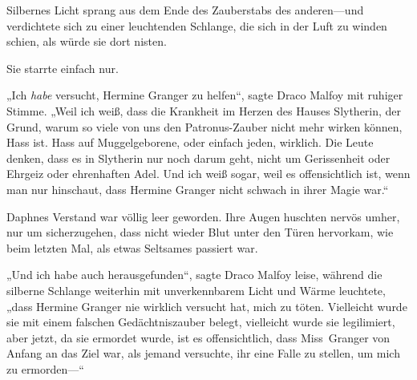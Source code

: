 
Silbernes Licht sprang aus dem Ende des Zauberstabs des anderen—und verdichtete sich zu einer leuchtenden Schlange, die sich in der Luft zu winden schien, als würde sie dort nisten.

Sie starrte einfach nur.

„Ich \emph{habe} versucht, Hermine Granger zu helfen“, sagte Draco Malfoy mit ruhiger Stimme. „Weil ich weiß, dass die Krankheit im Herzen des Hauses Slytherin, der Grund, warum so viele von uns den Patronus-Zauber nicht mehr wirken können, Hass ist. Hass auf Muggelgeborene, oder einfach jeden, wirklich. Die Leute denken, dass es in Slytherin nur noch darum geht, nicht um Gerissenheit oder Ehrgeiz oder ehrenhaften Adel. Und ich weiß sogar, weil es offensichtlich ist, wenn man nur hinschaut, dass Hermine Granger nicht schwach in ihrer Magie war.“

Daphnes Verstand war völlig leer geworden. Ihre Augen huschten nervös umher, nur um sicherzugehen, dass nicht wieder Blut unter den Türen hervorkam, wie beim letzten Mal, als etwas Seltsames passiert war.

„Und ich habe auch herausgefunden“, sagte Draco Malfoy leise, während die silberne Schlange weiterhin mit unverkennbarem Licht und Wärme leuchtete, „dass Hermine Granger nie wirklich versucht hat, mich zu töten. Vielleicht wurde sie mit einem falschen Gedächtniszauber belegt, vielleicht wurde sie legilimiert, aber jetzt, da sie ermordet wurde, ist es offensichtlich, dass Miss~Granger von Anfang an das Ziel war, als jemand versuchte, ihr eine Falle zu stellen, um mich zu ermorden—“

